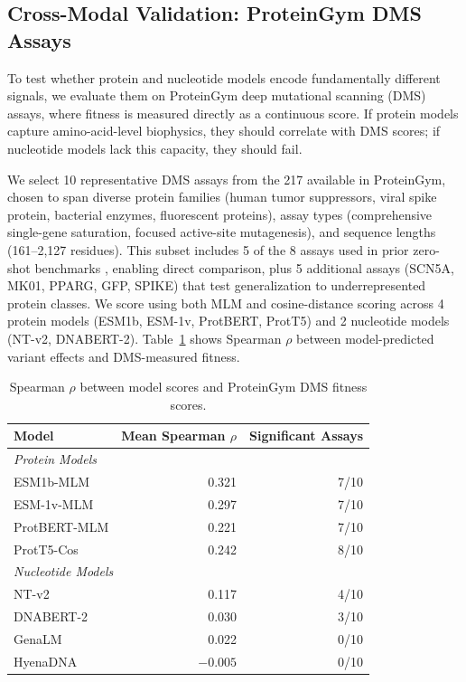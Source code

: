 \documentclass[9pt]{article}
\begin{document}
\subsection{Cross-Modal Validation: ProteinGym DMS Assays}

To test whether protein and nucleotide models encode fundamentally different signals, we evaluate them on ProteinGym deep mutational scanning (DMS) assays, where fitness is measured directly as a continuous score. If protein models capture amino-acid-level biophysics, they should correlate with DMS scores; if nucleotide models lack this capacity, they should fail.

We select 10 representative DMS assays from the 217 available in ProteinGym, chosen to span diverse protein families (human tumor suppressors, viral spike protein, bacterial enzymes, fluorescent proteins), assay types (comprehensive single-gene saturation, focused active-site mutagenesis), and sequence lengths (161--2,127 residues). This subset includes 5 of the 8 assays used in prior zero-shot benchmarks \cite{brandes2022protein}, enabling direct comparison, plus 5 additional assays (SCN5A, MK01, PPARG, GFP, SPIKE) that test generalization to underrepresented protein classes. We score using both MLM and cosine-distance scoring across 4 protein models (ESM1b, ESM-1v, ProtBERT, ProtT5) and 2 nucleotide models (NT-v2, DNABERT-2). Table~\ref{tab:proteingym_dms} shows Spearman $\rho$ between model-predicted variant effects and DMS-measured fitness.

\begin{table}[h]
\centering
\caption{Spearman $\rho$ between model scores and ProteinGym DMS fitness scores.}
\label{tab:proteingym_dms}
\small
\begin{tabular}{lrr}
\toprule
\textbf{Model} & \textbf{Mean Spearman $\rho$} & \textbf{Significant Assays} \\
\midrule
\multicolumn{3}{l}{\textit{Protein Models}} \\
ESM1b-MLM & 0.321 & 7/10 \\
ESM-1v-MLM & 0.297 & 7/10 \\
ProtBERT-MLM & 0.221 & 7/10 \\
ProtT5-Cos & 0.242 & 8/10 \\
\midrule
\multicolumn{3}{l}{\textit{Nucleotide Models}} \\
NT-v2 & 0.117 & 4/10 \\
DNABERT-2 & 0.030 & 3/10 \\
GenaLM & 0.022 & 0/10 \\
HyenaDNA & $-0.005$ & 0/10 \\
\bottomrule
\end{tabular}
\end{table}
\end{document}
